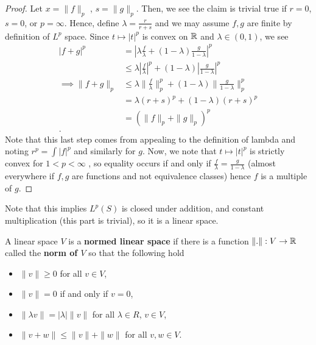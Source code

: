 \begin{proof}
	Let \(x = \|f\|_{p}\) 	, \(s = \|g\|_{p}\). Then, we see the claim is trivial true if \(r = 0\), \(s = 0\), or \(p = \infty\). Hence, define \(\lambda = \frac{r}{r+s}\) and we may assume \(f, g\) are finite by definition of \(L^{p}\) space. Since \(t \mapsto \left| t \right| ^{p}\) is convex on \(\mathbb{R}\) and \(\lambda \in \left( 0, 1 \right) \), we see
	\begin{align*}
		\left| f + g \right| ^{p} &=  \left| \lambda \frac{f}{\lambda}  + \left( 1-\lambda \right) \frac{g}{1-\lambda}\right| ^{p}\\
					  &\le \lambda \left| \frac{f}{\lambda} \right| ^{p} + \left( 1-\lambda \right) \left| \frac{g}{1-\lambda} \right| ^{p}  \\
		\implies \|f + g\|_{p} &\le \lambda \|\frac{f}{\lambda}\|_{p}^{p} + \left( 1-\lambda \right) \|\frac{g}{1-\lambda}\|^{p}_{p}\\
					  &= \lambda \left( r + s \right) ^{p} + \left( 1-\lambda \right) \left( r + s \right) ^{p}\\
					  &= \left( \|f\|_{p} + \|g\|_{p} \right)^{p}  \\
	.\end{align*}
	Note that this last step comes from appealing to the definition of lambda and noting \(r^{p} = \int \left| f \right| ^{p}\)  and similarly for \(g\). Now, we note that \(t \mapsto \left| t \right| ^{p}\) is strictly convex for \(1 < p < \infty\) , so equality occurs if and only if \(\frac{f}{\lambda} = \frac{g}{1-\lambda}\) (almost everywhere if \(f, g\) are functions and not equivalence classes) hence \(f\) is a multiple of \(g\).
\end{proof}
\begin{remark}
	Note that this implies \(L^{p}\left( S \right) \) is closed under addition, and constant multiplication (this part is trivial), so it is a linear space.
\end{remark}
\begin{definition}
A linear space \(V\) is a \textbf{normed linear space} if there is a function \(\|.\|: V \to \mathbb{R}\)  called the \textbf{norm of \(V\) } so that the following hold
\begin{itemize}
	\item \(\|v\|\ge 0\) for all \(v \in V\),
		\item \(\|v\|= 0\) if and only if \(v = 0\),
			\item \(\|\lambda v\| = \left| \lambda \right| \|v\|\) for all \(\lambda \in R\), \(v \in V\),
				\item \(\|v + w\|\le \|v\| + \|w\|\) for all \(v, w \in V\).
\end{itemize}
\end{definition}
